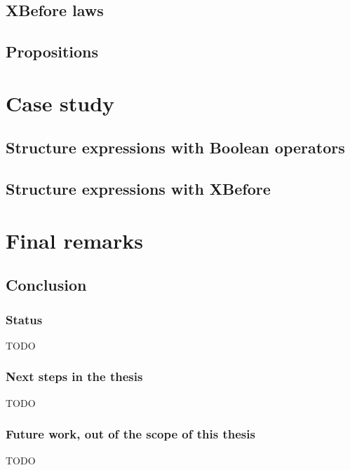 \documentclass{beamer}
\begin{document}
\subsection{XBefore laws}
\subsection{Propositions}

\section{Case study}
\subsection{Structure expressions with Boolean operators}
\subsection{Structure expressions with XBefore}

\section{Final remarks}
\subsection{Conclusion}

\begin{frame}
\frametitle{Status}
TODO
\end{frame}

\begin{frame}
\frametitle{Next steps in the thesis}
TODO
\end{frame}

\begin{frame}
\frametitle{Future work, out of the scope of this thesis}
TODO
\end{frame}

\end{document}
